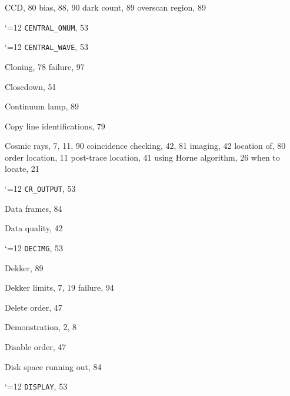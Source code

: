 \documentclass[twoside,11pt]{article}
\renewcommand{\_}{\texttt{\symbol{95}}}
\newcommand{\cmdname}{\begingroup \catcode`\_=12 \realcmdname}
\newcommand{\realcmdname}[1]{\endgroup\texttt{#1}}
\newcommand{\cmdname}[1]{#1}
\begin{document}
\begin{theindex}
  \indexspace

  \item CCD, 80
    \subitem bias, 88, 90
    \subitem dark count, 89
    \subitem overscan region, 89
  \item \cmdname {CENTRAL_ONUM}, 53
  \item \cmdname {CENTRAL_WAVE}, 53
  \item Cloning, 78
    \subitem failure, 97
  \item Closedown, 51
  \item Continuum lamp, 89
  \item Copy line identifications, 79
  \item Cosmic rays, 7, 11, 90
    \subitem coincidence checking, 42, 81
    \subitem imaging, 42
    \subitem location of, 80
    \subitem order location, 11
    \subitem post-trace location, 41
    \subitem using Horne algorithm, 26
    \subitem when to locate, 21
  \item \cmdname {CR_OUTPUT}, 53

  \indexspace

  \item Data frames, 84
  \item Data quality, 42
  \item \cmdname {DECIMG}, 53
  \item Dekker, 89
  \item Dekker limits, 7, 19
    \subitem failure, 94
  \item Delete order, 47
  \item Demonstration, 2, 8
  \item Disable order, 47
  \item Disk space
    \subitem running out, 84
  \item \cmdname {DISPLAY}, 53

  \indexspace


\end{theindex}
\end{document}
